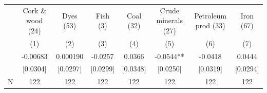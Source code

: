 {
\def\sym#1{\ifmmode^{#1}\else\(^{#1}\)\fi}
\begin{tabular}{l*{7}{c}}
\toprule
            &\multicolumn{1}{c}{Cork \& wood (24)}&\multicolumn{1}{c}{Dyes (53)}&\multicolumn{1}{c}{Fish (3)}&\multicolumn{1}{c}{Coal (32)}&\multicolumn{1}{c}{Crude minerals (27)}&\multicolumn{1}{c}{Petroleum prod (33)}&\multicolumn{1}{c}{Iron (67)}\\\cmidrule(lr){2-2}\cmidrule(lr){3-3}\cmidrule(lr){4-4}\cmidrule(lr){5-5}\cmidrule(lr){6-6}\cmidrule(lr){7-7}\cmidrule(lr){8-8}
            &\multicolumn{1}{c}{(1)}   &\multicolumn{1}{c}{(2)}   &\multicolumn{1}{c}{(3)}   &\multicolumn{1}{c}{(4)}   &\multicolumn{1}{c}{(5)}   &\multicolumn{1}{c}{(6)}   &\multicolumn{1}{c}{(7)}   \\
\midrule
{}          &    -0.00683   &    0.000190   &     -0.0257   &      0.0366   &     -0.0544** &     -0.0418   &      0.0444   \\
            &    [0.0304]   &    [0.0297]   &    [0.0299]   &    [0.0348]   &    [0.0250]   &    [0.0319]   &    [0.0294]   \\
\midrule
N           &         122   &         122   &         122   &         122   &         122   &         122   &         122   \\
\bottomrule
\end{tabular}
}
